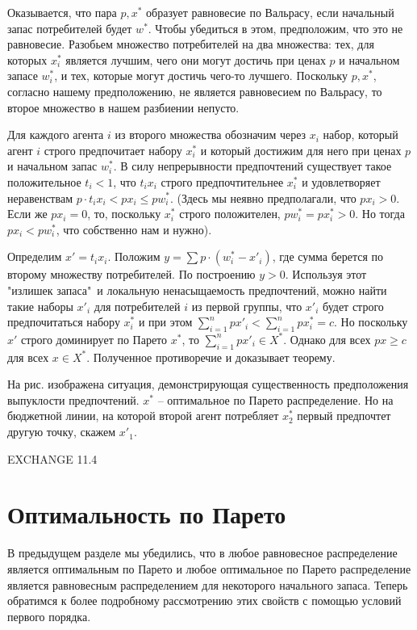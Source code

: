 Оказывается, что пара $p, x^*$ образует равновесие по Вальрасу, если начальный
запас потребителей будет $w^*$. Чтобы убедиться в этом, предположим, что это не равновесие.
Разобьем множество потребителей на два множества: тех, для которых $x^*_i$ является лучшим,
чего они могут достичь при ценах $p$ и начальном запасе $w^*_i$, и тех, которые могут достичь
чего-то лучшего. Поскольку $p, x^*$, согласно нашему предположению, не является равновесием
по Вальрасу, то второе множество в нашем разбиении непусто.

Для каждого агента $i$ из второго множества обозначим через $x_i$ набор, который
агент $i$ строго предпочитает набору $x^*_i$ и который достижим для него при ценах
$p$ и начальном запас $w^*_i$. В силу непрерывности предпочтений существует
такое положительное $t_i<1$, что $t_ix_i$ строго предпочтительнее $x^*_i$ и
удовлетворяет неравенствам $p\cdot t_ix_i<px_i\leq pw^*_i$. (Здесь мы неявно предполагали,
что $px_i>0$. Если же  $px_i=0$, то, поскольку $x^*_i$ строго положителен,
$pw^*_i=px^*_i>0$. Но тогда $px_i<pw^*_i$, что собственно нам и нужно).

Определим $x\prime=t_ix_i$. Положим $y=\sum p\cdot(w^*_i-x\prime_i)$, где сумма берется по
второму множеству потребителей. По построению $y>0$. Используя этот "излишек запаса"\, и
локальную ненасыщаемость предпочтений, можно найти такие наборы $x\prime_i$ для потребителей
$i$ из первой группы, что $x\prime_i$ будет строго предпочитаться набору $x^*_i$ и при этом
$\sum^n_{i=1}px\prime_i<\sum^n_{i=1}px^*_i=c$. Но поскольку $x\prime$ строго доминирует по
Парето $x^*$, то $\sum^n_{i=1}px\prime_i \in X^*.$ Однако для всех $px\geq c$ для всех $x \in X^*$.
Полученное противоречие и доказывает теорему.

На рис.      изображена ситуация, демонстрирующая существенность
предположения выпуклости предпочтений. $x^*$ -- оптимальное по Парето
распределение. Но на бюджетной линии, на которой второй агент потребляет
$x^*_2$ первый предпочтет другую точку, скажем $x\prime_1$.

EXCHANGE 11.4

\section*{Оптимальность по Парето }

В предыдущем разделе мы убедились, что в любое равновесное распределение является
оптимальным по Парето и любое оптимальное по Парето распределение является
равновесным распределением для некоторого начального запаса. Теперь обратимся к
более подробному рассмотрению этих свойств с помощью условий первого порядка.

